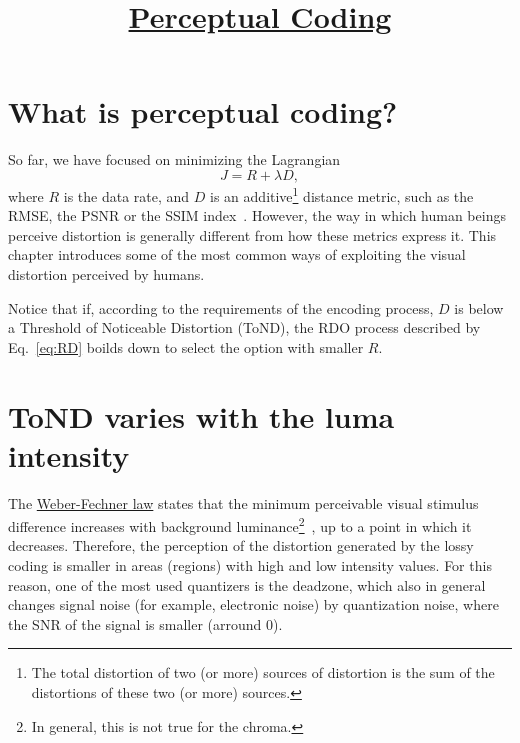 

\title{\href{https://sistemas-multimedia.github.io/contents/perceptual_coding/}{Perceptual Coding}}

\maketitle
\tableofcontents

\section{What is perceptual coding?}

So far, we have focused on minimizing the
Lagrangian~\cite{sullivan1998rate}
\begin{equation}
  J = R + \lambda D,
  \label{eq:RD}
\end{equation}
where $R$ is the data rate, and $D$ is an additive\footnote{The total
distortion of two (or more) sources of distortion is the sum of the
distortions of these two (or more) sources.} distance metric, such as
the RMSE, the PSNR or the SSIM index~\cite{wang2004image}. However, the
way in which human beings perceive distortion is generally different
from how these metrics express it. This chapter introduces some of the
most common ways of exploiting the visual distortion perceived by
humans.

Notice that if, according to the requirements of the encoding process, $D$ is below
a Threshold of Noticeable Distortion (ToND), the RDO process described
by Eq.~\eqref{eq:RD} boilds down to select the option with smaller $R$.

\section{ToND varies with the luma intensity}

The
\href{https://en.wikipedia.org/wiki/Weber%E2%80%93Fechner_law}{Weber-Fechner law}
  states that the minimum perceivable visual stimulus difference
  increases with background luminance\footnote{In general, this is not
    true for the chroma.}~\cite{naccari2014perceptually}, up to a
  point in which it decreases. Therefore, the perception of the
  distortion generated by the lossy coding is smaller in areas
  (regions) with high and low intensity values. For this reason, one
  of the most used quantizers is the deadzone, which also in general
  changes signal noise (for example, electronic noise) by quantization
  noise, where the SNR of the signal is smaller (arround 0).

